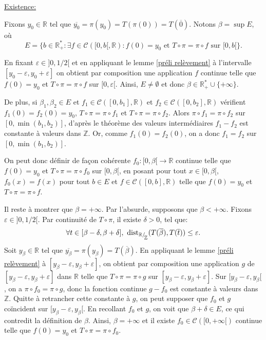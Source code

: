 \documentclass[11pt,a4 paper]{article}
\newcommand{\Rbb}{\mathbb{R}}
\newcommand{\Cc}{\mathcal{C}}
\newcommand*{\EnsembleQuotient}[2]%
{\ensuremath{%
		#1/\!\raisebox{-.65ex}{\ensuremath{\mathcal{#2}}}}}
\begin{document}
	\par \underline{Existence:}
	\par Fixons $y_0 \in \Rbb$ tel que $\overline{y_0}= \pi(y_0)=T(\pi(0))=T(\overline{0})$. Notons $\beta = \sup E$, où 
	$$E=\lbrace b \in \Rbb^*_+:\exists f \in \Cc([0,b[,\Rbb):f(0)=y_0\text{ et }T \circ \pi = \pi \circ f \text{ sur }[0,b[\rbrace.$$
	
	\par En fixant $\varepsilon \in ]0,1/2[$ et en appliquant le lemme \ref{préli relèvement} à l'intervalle $[y_0-\varepsilon,y_0+\varepsilon]$ on obtient par composition une application $f$ continue  telle que $f(0)=y_0$ et $T \circ \pi = \pi \circ f$ sur $[0,\varepsilon[$. Ainsi, $E\neq \emptyset$ et donc $\beta \in \Rbb^*_+ \cup \lbrace + \infty \rbrace$.\\
	
	\par De plus, si $\beta_1,\beta_2 \in E$ et $f_1 \in \Cc([0,b_1], \Rbb)$ et $f_2\in \Cc([0,b_2], \Rbb)$ vérifient $f_1(0)=f_2(0)=y_0$, $T \circ \pi = \pi \circ f_1$ et $T \circ \pi = \pi \circ f_2$. Alors $\pi \circ f_1 = \pi \circ f_2$ sur $[0, \min(b_1,b_2)]$, d'après le théorème des valeurs intermédiaires $f_1 - f_2$ est constante à valeurs dans $\mathbb{Z}$. Or, comme $f_1(0)=f_2(0)$, on a donc $f_1 = f_2$ sur $[0, \min(b_1,b_2)]$. \\
	
	\par On peut donc définir de façon cohérente $f_0:[0,\beta[\to \Rbb$ continue telle que $f(0)=y_0$ et $T \circ \pi = \pi \circ f_0$ sur $[0,\beta[$, en posant pour tout $x\in [0,\beta[$, $f_0(x)=f(x)$ pour tout $b\in E$ et $f \in \Cc([0,b],\Rbb)$ telle que $f(0)=y_0$ et $T \circ \pi = \pi \circ f$.\\
	
	\par Il reste à montrer que $\beta = + \infty$. Par l'absurde, supposons que $\beta < + \infty$. Fixons $\varepsilon \in ]0,1/2[$. Par continuité de $T\circ\pi$, il existe $\delta >0$, tel que:
	$$\forall t \in [\beta - \delta,\beta +\delta], \ \mathrm{dist}_{\EnsembleQuotient{\Rbb}{_\mathbb{Z}}}(T(\overline{\beta}),T(\overline{t}))\leq \varepsilon.$$
	Soit $y_{\beta}\in \Rbb$ tel que $\overline{y_\beta}=\pi(y_\beta)=T(\overline{\beta})$. En appliquant le lemme \ref{préli relèvement} à $[y_\beta-\varepsilon,y_\beta+\varepsilon]$, on obtient par composition une application $g$ de $[y_\beta -\varepsilon,y_\beta + \varepsilon]$ dans $\Rbb$ telle que $T\circ\pi=\pi \circ g$ sur $[y_\beta -\varepsilon,y_\beta + \varepsilon]$. Sur $[y_\beta - \varepsilon, y_\beta[$, on a $\pi\circ f_0= \pi \circ g$, donc la fonction continue $g-f_0$ est constante à valeurs dans $\mathbb{Z}$. Quitte à retrancher cette constante à $g$, on peut supposer que $f_0$ et $g$ coïncident sur $[y_\beta - \varepsilon, y_\beta[$. En recollant $f_0$ et $g$, on voit que $\beta + \delta \in E$, ce qui contredit la définition de $\beta$. Ainsi, $\beta = + \infty$ et il existe $f_0 \in \Cc([0,+\infty[)$ continue telle que $f(0)=y_0$ et $T \circ \pi = \pi \circ f_0$.\\
	
\end{document}
